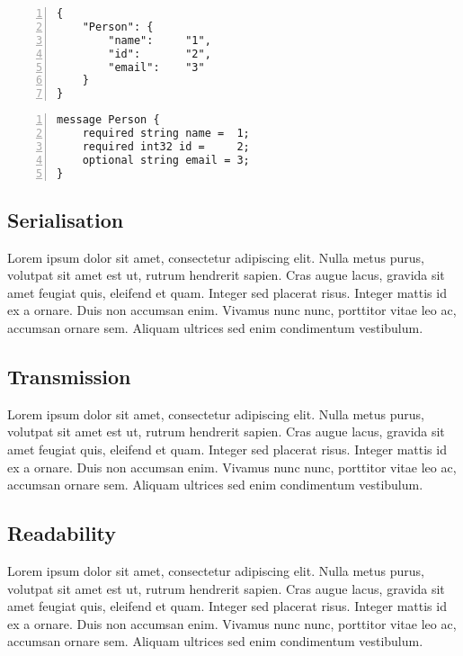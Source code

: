 \documentclass[../report.tex]{subfiles}
\begin{document}
\vspace{1mm}

\begin{Verbatim}[frame=single,numbers=left,framesep=5mm,label=JSON Object]
{
    "Person": {
        "name":     "1",
        "id":       "2",
        "email":    "3"
    }
}
\end{Verbatim}

\vspace{1mm}

\begin{Verbatim}[frame=single,numbers=left,framesep=5mm,label=Proto Object]
message Person {
    required string name =  1;
    required int32 id =     2;
    optional string email = 3;
}
\end{Verbatim}

\subsection{Serialisation}

Lorem ipsum dolor sit amet, consectetur adipiscing elit. Nulla metus purus, volutpat sit amet est ut, rutrum hendrerit sapien. Cras augue lacus, gravida sit amet feugiat quis, eleifend et quam. Integer sed placerat risus. Integer mattis id ex a ornare. Duis non accumsan enim. Vivamus nunc nunc, porttitor vitae leo ac, accumsan ornare sem. Aliquam ultrices sed enim condimentum vestibulum.

\subsection{Transmission}

Lorem ipsum dolor sit amet, consectetur adipiscing elit. Nulla metus purus, volutpat sit amet est ut, rutrum hendrerit sapien. Cras augue lacus, gravida sit amet feugiat quis, eleifend et quam. Integer sed placerat risus. Integer mattis id ex a ornare. Duis non accumsan enim. Vivamus nunc nunc, porttitor vitae leo ac, accumsan ornare sem. Aliquam ultrices sed enim condimentum vestibulum.

\subsection{Readability}

Lorem ipsum dolor sit amet, consectetur adipiscing elit. Nulla metus purus, volutpat sit amet est ut, rutrum hendrerit sapien. Cras augue lacus, gravida sit amet feugiat quis, eleifend et quam. Integer sed placerat risus. Integer mattis id ex a ornare. Duis non accumsan enim. Vivamus nunc nunc, porttitor vitae leo ac, accumsan ornare sem. Aliquam ultrices sed enim condimentum vestibulum.
\end{document}

